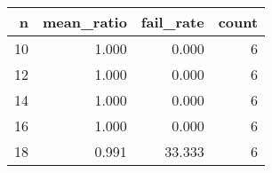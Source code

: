 \begin{tabular}{rrrr}
\toprule
n & mean\_ratio & fail\_rate & count \\
\midrule
10 & 1.000 & 0.000 & 6 \\
12 & 1.000 & 0.000 & 6 \\
14 & 1.000 & 0.000 & 6 \\
16 & 1.000 & 0.000 & 6 \\
18 & 0.991 & 33.333 & 6 \\
\bottomrule
\end{tabular}
